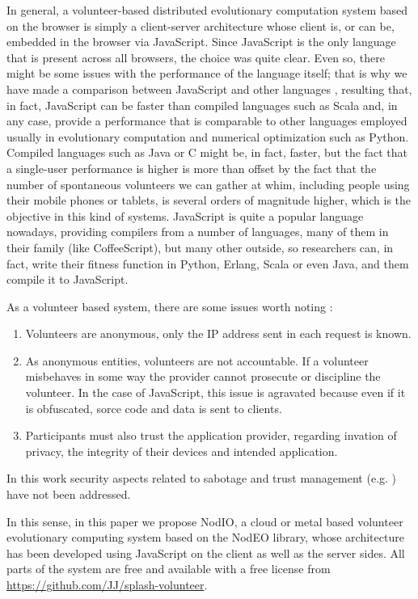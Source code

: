 \documentclass[journal,onecolumn]{IEEEtran}
\begin{document}
In general, a volunteer-based distributed evolutionary computation
system based on the browser is simply a client-server architecture
whose client is, or can be, embedded in the browser via
JavaScript. Since JavaScript is  the only language that is present
across all browsers, the choice was quite clear. Even so, there might
be some issues with the performance of the language itself; that is
why we have made a comparison between JavaScript and other languages
\cite{2015arXiv151101088M}, resulting that, in fact, JavaScript can be
faster than compiled languages such as Scala and, in any case, provide
a performance that is comparable to other languages employed usually
in evolutionary computation and numerical optimization such as Python. Compiled languages such as
Java or C might be, in fact, faster, but the fact that a single-user
performance is higher is more than offset by the fact that the number
of spontaneous volunteers we can gather at whim, including people
using their mobile phones or tablets, is several orders of magnitude
higher, which is the objective in this kind of systems. JavaScript is
quite a popular language nowadays, providing compilers from a number
of languages, many of them in their family (like CoffeeScript), but
many other outside, so researchers can, in fact, write their fitness
function in Python, Erlang, Scala or even Java, and them compile it to
JavaScript. 

As a volunteer based system, there are some issues worth 
noting \cite{sarmenta2001volunteer,web:BOINC} :\begin{enumerate}
\item Volunteers are anonymous, only the IP address sent in 
each request is known.
\item As anonymous entities, volunteers are not accountable. 
If a volunteer misbehaves in some way the provider cannot 
prosecute or discipline the volunteer. In the case of JavaScript,
this issue is agravated because even if it is obfuscated, sorce code
and data is sent to clients. 
\item Participants must also trust the application provider, 
regarding invation of privacy, the integrity of their devices 
and intended application. 
\end{enumerate}
In this work security aspects related to sabotage and 
trust management (e.g. \cite{domingues2007sabotage}) have not been addressed.

In this sense, in this paper we propose {\sf NodIO}, a cloud or metal
based 
volunteer evolutionary computing system based on the {\sf NodEO}
library, whose architecture 
has been developed using JavaScript on the client as well as the
server sides. 
All parts of the system are free and available with a free
license from \url{https://github.com/JJ/splash-volunteer}.
\end{document}
